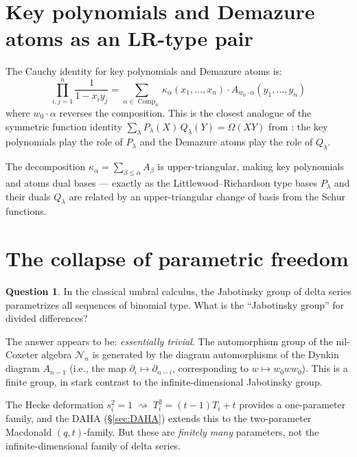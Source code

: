 \documentclass[11pt]{amsart}
\theoremstyle{definition}
\newtheorem{question}[theorem]{Question}
\newcommand{\cN}{\mathcal{N}}
\DeclareMathOperator{\Comp}{Comp}
\begin{document}
\section{Key polynomials and Demazure atoms as an LR-type pair}

The Cauchy identity for key polynomials and Demazure atoms is:
\[
  \prod_{i,j=1}^{n} \frac{1}{1 - x_i y_j} = \sum_{\alpha \in
  \Comp_n} \kappa_\alpha(x_1, \dots, x_n) \cdot
  A_{w_0 \cdot \alpha}(y_1, \dots, y_n)
\]
where $w_0 \cdot \alpha$ reverses the composition. This is the
closest analogue of the symmetric function identity
$\sum_\lambda P_\lambda(X)\, Q_\lambda(Y) = \Omega(XY)$ from
\cite{Langer}: the key polynomials play the role of $P_\lambda$
and the Demazure atoms play the role of $Q_\lambda$.

The decomposition
$\kappa_\alpha = \sum_{\beta \leq \alpha} A_\beta$
is upper-triangular, making key polynomials and atoms dual bases
--- exactly as the Littlewood--Richardson type bases $P_\lambda$
and their duals $Q_\lambda$ are related by an upper-triangular
change of basis from the Schur functions.

\section{The collapse of parametric freedom}

\begin{question}
  In the classical umbral calculus, the Jabotinsky group of delta
  series parametrizes all sequences of binomial type. What is
  the ``Jabotinsky group'' for divided differences?
\end{question}

The answer appears to be: \emph{essentially trivial}. The
automorphism group of the nil-Coxeter algebra $\cN_n$ is generated
by the diagram automorphisms of the Dynkin diagram $A_{n-1}$ (i.e.,
the map $\partial_i \mapsto \partial_{n-i}$, corresponding to
$w \mapsto w_0 w w_0$). This is a finite group, in stark contrast
to the infinite-dimensional Jabotinsky group.

The Hecke deformation $s_i^2 = 1 \;\rightsquigarrow\; T_i^2
= (t-1)T_i + t$ provides a one-parameter family, and the
DAHA (\S\ref{sec:DAHA}) extends this to the two-parameter
Macdonald $(q,t)$-family. But these are \emph{finitely many}
parameters, not the infinite-dimensional family of delta series.
\end{document}

